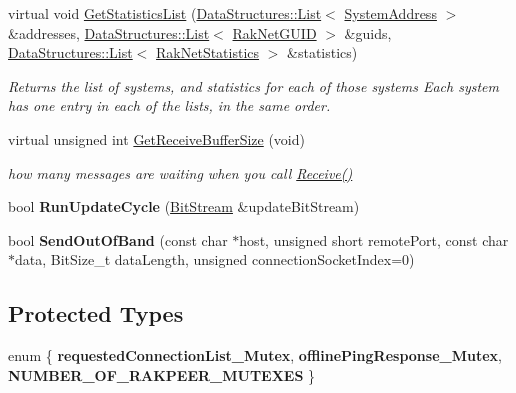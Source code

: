 \begin{DoxyCompactItemize}
virtual void \hyperlink{class_rak_net_1_1_rak_peer_acffede0c021450b37b16e6946c694a7d}{Get\-Statistics\-List} (\hyperlink{class_data_structures_1_1_list}{Data\-Structures\-::\-List}$<$ \hyperlink{struct_rak_net_1_1_system_address}{System\-Address} $>$ \&addresses, \hyperlink{class_data_structures_1_1_list}{Data\-Structures\-::\-List}$<$ \hyperlink{struct_rak_net_1_1_rak_net_g_u_i_d}{Rak\-Net\-G\-U\-I\-D} $>$ \&guids, \hyperlink{class_data_structures_1_1_list}{Data\-Structures\-::\-List}$<$ \hyperlink{struct_rak_net_1_1_rak_net_statistics}{Rak\-Net\-Statistics} $>$ \&statistics)
\begin{DoxyCompactList}\small\item\em Returns the list of systems, and statistics for each of those systems Each system has one entry in each of the lists, in the same order. \end{DoxyCompactList}\item 
\hypertarget{class_rak_net_1_1_rak_peer_adf51ef909abde91448a0a5d17e1da65c}{virtual unsigned int \hyperlink{class_rak_net_1_1_rak_peer_adf51ef909abde91448a0a5d17e1da65c}{Get\-Receive\-Buffer\-Size} (void)}\label{class_rak_net_1_1_rak_peer_adf51ef909abde91448a0a5d17e1da65c}

\begin{DoxyCompactList}\small\item\em how many messages are waiting when you call \hyperlink{class_rak_net_1_1_rak_peer_a46d90fb903e747f76d63eb3a96543740}{Receive()} \end{DoxyCompactList}\item 
\hypertarget{class_rak_net_1_1_rak_peer_a291f9e8e201bb077798c98638859a3a5}{bool {\bfseries Run\-Update\-Cycle} (\hyperlink{class_rak_net_1_1_bit_stream}{Bit\-Stream} \&update\-Bit\-Stream)}\label{class_rak_net_1_1_rak_peer_a291f9e8e201bb077798c98638859a3a5}

\item 
\hypertarget{class_rak_net_1_1_rak_peer_ad19b98568d0f0d3a1612872be35010cb}{bool {\bfseries Send\-Out\-Of\-Band} (const char $\ast$host, unsigned short remote\-Port, const char $\ast$data, Bit\-Size\-\_\-t data\-Length, unsigned connection\-Socket\-Index=0)}\label{class_rak_net_1_1_rak_peer_ad19b98568d0f0d3a1612872be35010cb}

\end{DoxyCompactItemize}
\subsection*{Protected Types}
\begin{DoxyCompactItemize}
\item 
enum \{ {\bfseries requested\-Connection\-List\-\_\-\-Mutex}, 
{\bfseries offline\-Ping\-Response\-\_\-\-Mutex}, 
{\bfseries N\-U\-M\-B\-E\-R\-\_\-\-O\-F\-\_\-\-R\-A\-K\-P\-E\-E\-R\-\_\-\-M\-U\-T\-E\-X\-E\-S}
 \}
\end{DoxyCompactItemize}
